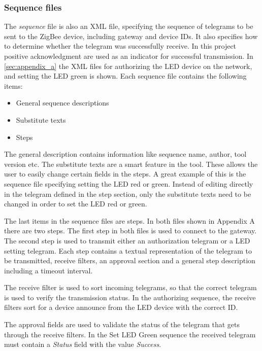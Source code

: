 \documentclass[Main]{subfiles}
\begin{document}
		\subsubsection{Sequence files}
			The \emph{sequence} file is also an XML file, specifying the sequence of telegrams to be sent to the ZigBee device, including gateway and device IDs. 
			It also specifies how to determine whether the telegram was successfully receive. 
			In this project positive acknowledgment are used as an indicator for successful transmission.
			In \ref{sec:appendix_a} the XML files for authorizing the LED device on the network, and setting the LED green is shown.
			Each sequence file contains the following items: 
			\begin{itemize}
				\item General sequence descriptions
				\item Substitute texts
				\item Steps
			\end{itemize}
			The general description contains information like sequence name, author, tool version etc.
			The substitute texts are a smart feature in the tool. 
			These allows the user to easily change certain fields in the steps. 
			A great example of this is the sequence file specifying setting the LED red or green.
			Instead of editing directly in the telegram defined in the step section, only the substitute texts need to be changed in order to set the LED red or green. 

			The last items in the sequence files are steps. 
			In both files shown in Appendix A there are two steps. 
			The first step in both files is used to connect to the gateway.
			The second step is used to transmit either an authorization telegram or a LED setting telegram.
			Each step contains a textual representation of the telegram to be transmitted, receive filters, an approval section and a general step description including a timeout interval.

			The receive filter is used to sort incoming telegrams, so that the correct telegram is used to verify the transmission status. 
			In the authorizing sequence, the receive filters sort for a device announce from the LED device with the correct ID.
			
			The approval fields are used to validate the status of the telegram that gets through the receive filters. 
			In the Set LED Green sequence the received telegram must contain a \emph{Status} field with the value \emph{Success}.
\end{document}

